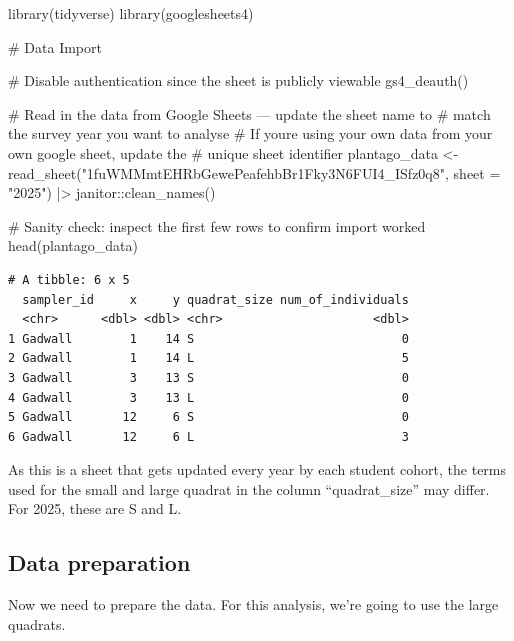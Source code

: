 \documentclass[
  letterpaper,
  DIV=11,
  numbers=noendperiod]{scrreprt}
\newenvironment{Shaded}{\begin{snugshade}}{\end{snugshade}}
\newcommand{\AttributeTok}[1]{\textcolor[rgb]{0.40,0.45,0.13}{#1}}
\newcommand{\CommentTok}[1]{\textcolor[rgb]{0.37,0.37,0.37}{#1}}
\newcommand{\FunctionTok}[1]{\textcolor[rgb]{0.28,0.35,0.67}{#1}}
\newcommand{\NormalTok}[1]{\textcolor[rgb]{0.00,0.23,0.31}{#1}}
\newcommand{\OtherTok}[1]{\textcolor[rgb]{0.00,0.23,0.31}{#1}}
\newcommand{\SpecialCharTok}[1]{\textcolor[rgb]{0.37,0.37,0.37}{#1}}
\newcommand{\StringTok}[1]{\textcolor[rgb]{0.13,0.47,0.30}{#1}}
\begin{document}
\begin{Shaded}
\begin{Highlighting}[]
\FunctionTok{library}\NormalTok{(tidyverse)}
\FunctionTok{library}\NormalTok{(googlesheets4)}

\CommentTok{\# Data Import}

\CommentTok{\# Disable authentication since the sheet is publicly viewable}
\FunctionTok{gs4\_deauth}\NormalTok{()}

\CommentTok{\# Read in the data from Google Sheets — update the sheet name to}
\CommentTok{\# match the survey year you want to analyse}
\CommentTok{\# If you\textquotesingle{}re using your own data from your own google sheet, update the }
\CommentTok{\# unique sheet identifier}
\NormalTok{plantago\_data }\OtherTok{\textless{}{-}} \FunctionTok{read\_sheet}\NormalTok{(}\StringTok{"1fuWMMmtEHRbGewePeafehbBr1Fky3N6FUI4\_ISfz0q8"}\NormalTok{,}
  \AttributeTok{sheet =} \StringTok{"2025"}\NormalTok{) }\SpecialCharTok{|\textgreater{}}
\NormalTok{  janitor}\SpecialCharTok{::}\FunctionTok{clean\_names}\NormalTok{()}

\CommentTok{\# Sanity check: inspect the first few rows to confirm import worked}
\FunctionTok{head}\NormalTok{(plantago\_data)}
\end{Highlighting}
\end{Shaded}

\begin{verbatim}
# A tibble: 6 x 5
  sampler_id     x     y quadrat_size num_of_individuals
  <chr>      <dbl> <dbl> <chr>                     <dbl>
1 Gadwall        1    14 S                             0
2 Gadwall        1    14 L                             5
3 Gadwall        3    13 S                             0
4 Gadwall        3    13 L                             0
5 Gadwall       12     6 S                             0
6 Gadwall       12     6 L                             3
\end{verbatim}

As this is a sheet that gets updated every year by each student cohort,
the terms used for the small and large quadrat in the column
``quadrat\_size'' may differ. For 2025, these are S and L.

\subsection{Data preparation}\label{data-preparation}

Now we need to prepare the data. For this analysis, we're going to use
the large quadrats.
\end{document}
